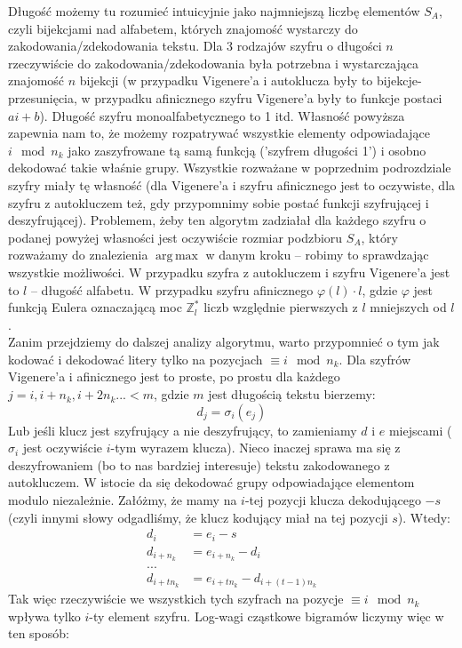 \documentclass[a4paper]{article}
\DeclareMathOperator*{\argmax}{arg\,max}
\begin{document}
Długość możemy tu rozumieć intuicyjnie jako najmniejszą liczbę elementów $S_A$, czyli bijekcjami nad alfabetem, których znajomość wystarczy do zakodowania/zdekodowania tekstu. Dla 3 rodzajów szyfru o długości $n$ rzeczywiście do zakodowania/zdekodowania była potrzebna i wystarczająca znajomość $n$ bijekcji (w przypadku Vigenere'a i autoklucza były to bijekcje-przesunięcia, w przypadku afinicznego szyfru Vigenere'a były to funkcje postaci $ai+b$). Długość szyfru monoalfabetycznego to 1 itd. Własność powyższa zapewnia nam to, że możemy rozpatrywać wszystkie elementy odpowiadające $i \mod n_k$ jako zaszyfrowane tą samą funkcją ('szyfrem długości 1') i osobno dekodować takie właśnie grupy. Wszystkie rozważane w poprzednim podrozdziale szyfry miały tę własność (dla Vigenere'a i szyfru afinicznego jest to oczywiste, dla szyfru z autokluczem też, gdy przypomnimy sobie postać funkcji szyfrującej i deszyfrującej). Problemem, żeby ten algorytm zadziałał dla każdego szyfru o podanej powyżej własności jest oczywiście rozmiar podzbioru $S_A$, który rozważamy do znalezienia $\argmax$ w danym kroku – robimy to sprawdzając wszystkie możliwości. W przypadku szyfra z autokluczem i szyfru Vigenere'a jest to $l$ – długość alfabetu. W przypadku szyfru afinicznego $\varphi(l) \cdot l$, gdzie $\varphi$ jest funkcją Eulera oznaczającą moc $\mathbb{Z}_l^*$ liczb względnie pierwszych z $l$ mniejszych od $l$.\\
Zanim przejdziemy do dalszej analizy algorytmu, warto przypomnieć o tym jak kodować i dekodować litery tylko na pozycjach $\equiv i \mod n_k$.
Dla szyfrów Vigenere'a i afinicznego jest to proste, po prostu dla każdego $j = i, i+n_k, i+2n_k... < m$, gdzie $m$ jest długością tekstu bierzemy:
$$d_j = \sigma_i(e_j)$$
Lub jeśli klucz jest szyfrujący a nie deszyfrujący, to zamieniamy $d$ i $e$ miejscami ($\sigma_i$ jest oczywiście $i$-tym wyrazem klucza). Nieco inaczej sprawa ma się z deszyfrowaniem (bo to nas bardziej interesuje) tekstu zakodowanego z autokluczem. W istocie da się dekodować grupy odpowiadające elementom modulo niezależnie. Załóżmy, że mamy na $i$-tej pozycji klucza dekodującego $-s$ (czyli innymi słowy odgadliśmy, że klucz kodujący miał na tej pozycji $s$). Wtedy:
\begin{align*}
    d_i &= e_i - s\\
    d_{i+n_k} &= e_{i+n_k} - d_i\\
    ...\\
    d_{i+tn_k} &= e_{i+tn_k} - d_{i+(t-1)n_k}
\end{align*}
Tak więc rzeczywiście we wszystkich tych szyfrach na pozycje $\equiv i \mod n_k$ wpływa tylko $i$-ty element szyfru. Log-wagi cząstkowe bigramów liczymy więc w ten sposób:\\\\
\end{document}
